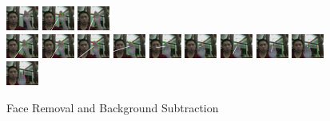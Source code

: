 \documentclass[12pt]{article}
\begin{document}
\begin{figure}[H]
\includegraphics[width=40px, height=30px]{../data/nofacenobg/img0037.jpg}
\includegraphics[width=40px, height=30px]{../data/nofacenobg/img0038.jpg}
\includegraphics[width=40px, height=30px]{../data/nofacenobg/img0039.jpg} \\
\includegraphics[width=40px, height=30px]{../data/nofacenobg/img0040.jpg}
\includegraphics[width=40px, height=30px]{../data/nofacenobg/img0041.jpg}
\includegraphics[width=40px, height=30px]{../data/nofacenobg/img0042.jpg}
\includegraphics[width=40px, height=30px]{../data/nofacenobg/img0043.jpg}
\includegraphics[width=40px, height=30px]{../data/nofacenobg/img0044.jpg}
\includegraphics[width=40px, height=30px]{../data/nofacenobg/img0045.jpg}
\includegraphics[width=40px, height=30px]{../data/nofacenobg/img0046.jpg}
\includegraphics[width=40px, height=30px]{../data/nofacenobg/img0047.jpg}
\includegraphics[width=40px, height=30px]{../data/nofacenobg/img0048.jpg}
\includegraphics[width=40px, height=30px]{../data/nofacenobg/img0049.jpg}
\label{seq-nofacenobg}
\caption{Face Removal and Background Subtraction}
\end{figure}
\end{document}
